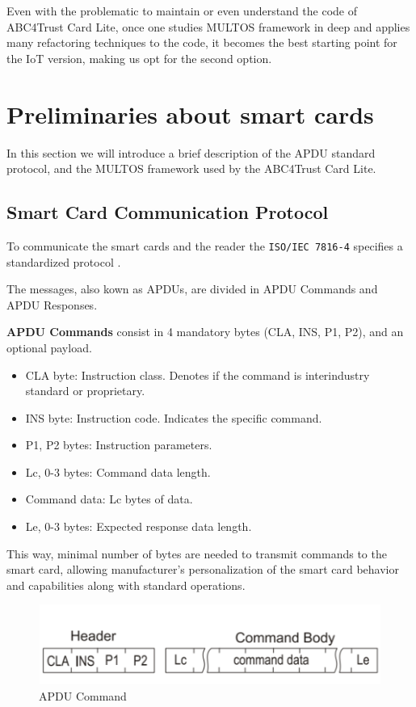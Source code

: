 Even with the problematic to maintain or even understand the code of ABC4Trust Card Lite, once one studies MULTOS framework in deep and applies many refactoring techniques to the code, it becomes the best starting point for the IoT version, making us opt for the second option.





\section{Preliminaries about smart cards}

In this section we will introduce a brief description of the APDU standard protocol, and the MULTOS framework used by the ABC4Trust Card Lite.


\subsection{Smart Card Communication Protocol}\label{subsec:APDU}

To communicate the smart cards and the reader the \texttt{ISO/IEC 7816-4} \citep{APDUISO} specifies a standardized protocol .

The messages, also kown as \acp{APDU}, are divided in APDU Commands and APDU Responses.

\textbf{APDU Commands} consist in 4 mandatory bytes (CLA, INS, P1, P2), and an optional payload.

\begin{itemize}
	\item CLA byte: Instruction class. Denotes if the command is interindustry standard or proprietary.
	\item INS byte: Instruction code. Indicates the specific command.
	\item P1, P2 bytes: Instruction parameters.
	\item Lc, 0-3 bytes: Command data length.
	\item Command data: Lc bytes of data.
	\item Le, 0-3 bytes: Expected response data length.
\end{itemize}

This way, minimal number of bytes are needed to transmit commands to the smart card, allowing manufacturer's personalization of the smart card behavior and capabilities along with standard operations.

\begin{figure}[bth]
	\begin{center}
		\includegraphics[width=0.55\linewidth]{gfx/APDUCommand}
	\end{center}
	\caption{APDU Command}
	\label{fig:APDUCommand}
\end{figure}



